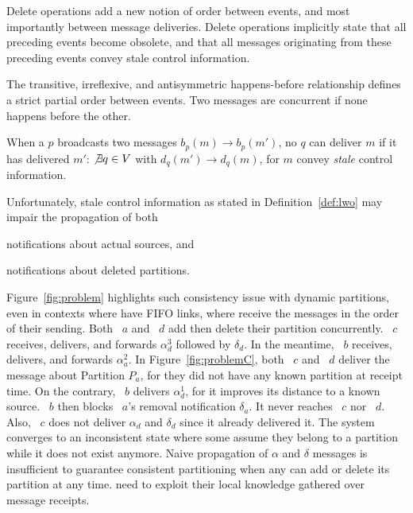 Delete operations add a new notion of order between events, and most
importantly between message deliveries. Delete operations implicitly
state that all preceding events become obsolete, and that all messages
originating from these preceding events convey stale control
information.

\begin{definition}
  The transitive, irreflexive, and antisymmetric happens-before
  relationship defines a strict partial order between events. Two
  messages are concurrent if none happens before the other.
\end{definition}

\begin{definition}
  When a \process $p$ broadcasts two messages $b_p(m) \rightarrow
  b_p(m')$, no \process $q$ can deliver $m$ if it has delivered $m'$:
  $\not\exists q \in V$ with $d_q(m') \rightarrow d_q(m)$, for $m$
  convey \emph{stale} control information.
\end{definition}






Unfortunately, stale control information as stated in
Definition~\ref{def:lwo} may impair the propagation of both
\begin{inparaenum}[(i)]
\item notifications about actual sources, and
\item notifications about deleted partitions.
\end{inparaenum}
Figure~\ref{fig:problem} highlights such consistency issue with
dynamic partitions, even in contexts where \processes have FIFO links,
\ie where \processes receive the messages in the order of their
sending. Both \Process~$a$ and \Process~$d$ add then delete their
partition concurrently. \Process~$c$ receives, delivers, and forwards
$\alpha_d^3$ followed by $\delta_d$. In the meantime, \Process~$b$
receives, delivers, and forwards $\alpha_a^2$. In
Figure~\ref{fig:problemC}, both \Process~$c$ and \Process~$d$ deliver
the message about Partition $P_a$, for they did not have any known
partition at receipt time. On the contrary, \Process~$b$ delivers
$\alpha_d^1$, for it improves its distance to a known
source. \Process~$b$ then blocks \Process~$a$'s removal notification
$\delta_a$. It never reaches \Process~$c$ nor \Process~$d$. Also,
\Process~$c$ does not deliver $\alpha_d$ and $\delta_d$ since it
already delivered it. The system converges to an inconsistent state
where some \processes assume they belong to a partition while it does
not exist anymore. Naive propagation of $\alpha$ and $\delta$ messages
is insufficient to guarantee consistent partitioning when any \process
can add or delete its partition at any time. \Processes need to
exploit their local knowledge gathered over message receipts.


